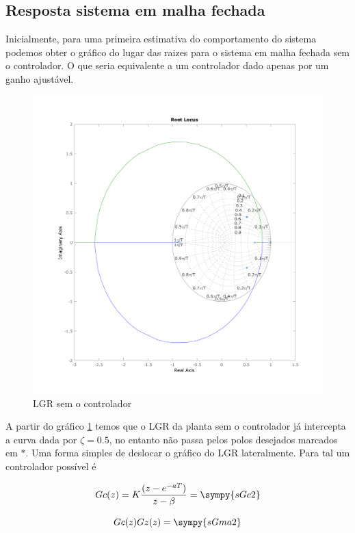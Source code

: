 \documentclass[a4paper,11pt]{article}
\begin{document}
\subsection{Resposta sistema em malha fechada}


Inicialmente, para uma primeira estimativa do comportamento do sistema podemos obter o gráfico do lugar das raizes para o sistema em malha fechada sem o controlador. O que seria equivalente a um controlador dado apenas por um ganho ajustável.

\begin{figure}[H]
    \centering
    \includegraphics[width=0.9\linewidth]{img/exsim3-rlocus-g2.png}
    \caption{LGR sem o controlador}
    \label{fig:ex3-rlocus-g2}
\end{figure}

A partir do gráfico \ref{fig:ex3-rlocus-g2} temos que o LGR da planta sem o controlador já intercepta a curva dada por $\zeta = 0.5$, no entanto não passa pelos polos desejados marcados em $*$. Uma forma simples de deslocar o gráfico do LGR lateralmente. Para tal um controlador possível é

\begin{equation}
    Gc(z) = K\frac{(z-e^{-aT})}{z-\beta} = \sympy{sGc2}
\end{equation}

\begin{equation}
    Gc(z)Gz(z) = \sympy{sGma2}
\end{equation}
\end{document}
